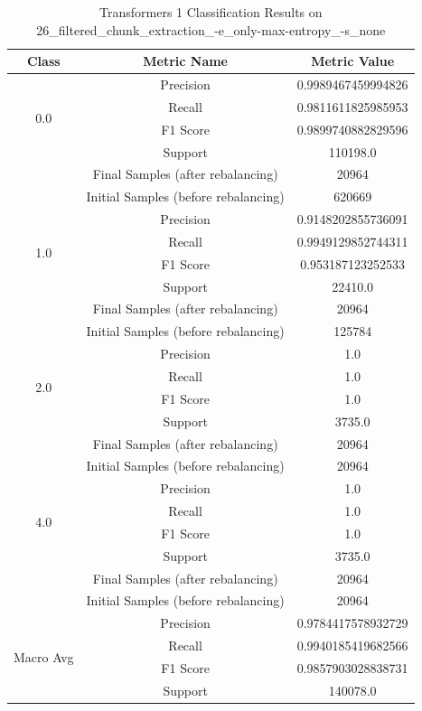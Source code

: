 \begin{longtable}{|c|c|c|}
\caption{Transformers 1 Classification Results on 26\_filtered\_chunk\_extraction\_-e\_only-max-entropy\_-s\_none} \label{tab:26_filtered_chunk_extraction_-e_only-max-entropy_-s_none_transformers_1_classifiers_results} \\
\hline
Class & Metric Name & Metric Value \\
\hline
\multirow{4}{*}{0.0} & Precision & 0.9989467459994826 \\
 & Recall & 0.9811611825985953 \\
 & F1 Score & 0.9899740882829596 \\
 & Support & 110198.0 \\
 & Final Samples (after rebalancing) & 20964 \\
 & Initial Samples (before rebalancing) & 620669 \\
\hline
\multirow{4}{*}{1.0} & Precision & 0.9148202855736091 \\
 & Recall & 0.9949129852744311 \\
 & F1 Score & 0.953187123252533 \\
 & Support & 22410.0 \\
 & Final Samples (after rebalancing) & 20964 \\
 & Initial Samples (before rebalancing) & 125784 \\
\hline
\multirow{4}{*}{2.0} & Precision & 1.0 \\
 & Recall & 1.0 \\
 & F1 Score & 1.0 \\
 & Support & 3735.0 \\
 & Final Samples (after rebalancing) & 20964 \\
 & Initial Samples (before rebalancing) & 20964 \\
\hline
\multirow{4}{*}{4.0} & Precision & 1.0 \\
 & Recall & 1.0 \\
 & F1 Score & 1.0 \\
 & Support & 3735.0 \\
 & Final Samples (after rebalancing) & 20964 \\
 & Initial Samples (before rebalancing) & 20964 \\
\hline
\multirow{4}{*}{Macro Avg} & Precision & 0.9784417578932729 \\
 & Recall & 0.9940185419682566 \\
 & F1 Score & 0.9857903028838731 \\
 & Support & 140078.0 \\

\end{longtable}
